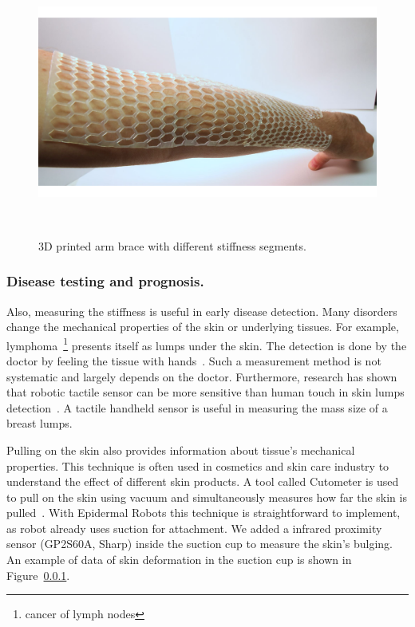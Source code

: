 \begin{figure}[!t]
\centering
\includegraphics[width=1\columnwidth]{pictures/applications/arm_brace.pdf}
\caption{3D printed arm brace with different stiffness segments.}~\label{fig:arm_brace}
\end{figure}

\subsubsection{Disease testing and prognosis.}
Also, measuring the stiffness is useful in early disease detection. Many disorders change the mechanical properties of the skin or underlying tissues. For example, lymphoma~\footnote{cancer of lymph nodes} presents itself as lumps under the skin. The detection is done by the doctor by feeling the tissue with hands~\cite{de2002early}. Such a measurement method is not systematic and largely depends on the doctor. Furthermore, research has shown that robotic tactile sensor can be more sensitive than human touch in skin lumps detection~\cite{gwilliam2010human}. A tactile handheld sensor is useful in measuring the mass size of a breast lumps.~\cite{wellman2001tactile}

Pulling on the skin also provides information about tissue's mechanical properties. This technique is often used in cosmetics and skin care industry to understand the effect of different skin products. A tool called Cutometer is used to pull on the skin using vacuum and simultaneously measures how far the skin is pulled~\cite{dobrev2000use}. With Epidermal Robots this technique is straightforward to implement, as robot already uses suction for attachment. We added a infrared proximity sensor (GP2S60A, Sharp) inside the suction cup to measure the skin's bulging. An example of data of skin deformation in the suction cup is shown in Figure~\ref{}. 

